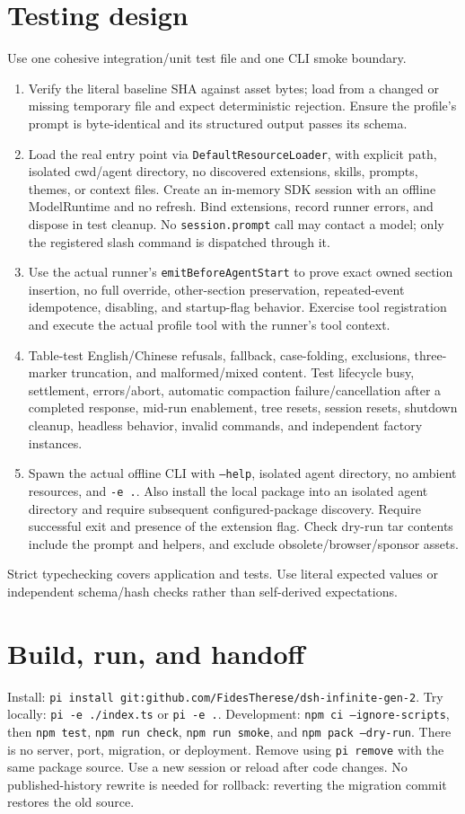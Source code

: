 \documentclass[10pt]{ltjsarticle}
\begin{document}
\section{Testing design}
Use one cohesive integration/unit test file and one CLI smoke boundary.
\begin{enumerate}
\item Verify the literal baseline SHA against asset bytes; load from a changed
or missing temporary file and expect deterministic rejection. Ensure the
profile's prompt is byte-identical and its structured output passes its schema.
\item Load the real entry point via \texttt{DefaultResourceLoader}, with
explicit path, isolated cwd/agent directory, no discovered extensions, skills,
prompts, themes, or context files. Create an in-memory SDK session with an
offline ModelRuntime and no refresh. Bind extensions, record runner errors,
and dispose in test cleanup. No \texttt{session.prompt} call may contact a model;
only the registered slash command is dispatched through it.
\item Use the actual runner's \texttt{emitBeforeAgentStart} to prove exact owned
section insertion, no full override, other-section preservation, repeated-event
idempotence, disabling, and startup-flag behavior. Exercise tool registration
and execute the actual profile tool with the runner's tool context.
\item Table-test English/Chinese refusals, fallback, case-folding, exclusions,
three-marker truncation, and malformed/mixed content. Test lifecycle busy,
settlement, errors/abort, automatic compaction failure/cancellation after a
completed response, mid-run enablement, tree resets, session resets, shutdown
cleanup, headless behavior, invalid commands, and independent factory instances.
\item Spawn the actual offline CLI with \texttt{--help}, isolated agent directory,
no ambient resources, and \texttt{-e .}. Also install the local package into
an isolated agent directory and require subsequent configured-package discovery.
Require successful exit and presence of the extension flag. Check dry-run tar contents include the prompt and helpers,
and exclude obsolete/browser/sponsor assets.
\end{enumerate}
Strict typechecking covers application and tests. Use literal expected values
or independent schema/hash checks rather than self-derived expectations.

\section{Build, run, and handoff}
Install: \texttt{pi install git:github.com/FidesTherese/dsh-infinite-gen-2}.
Try locally: \texttt{pi -e ./index.ts} or \texttt{pi -e .}. Development:
\texttt{npm ci --ignore-scripts}, then \texttt{npm test},
\texttt{npm run check}, \texttt{npm run smoke}, and
\texttt{npm pack --dry-run}. There is no server, port, migration, or deployment.
Remove using \texttt{pi remove} with the same package source. Use a new session
or reload after code changes. No published-history rewrite is needed for
rollback: reverting the migration commit restores the old source.
\end{document}
